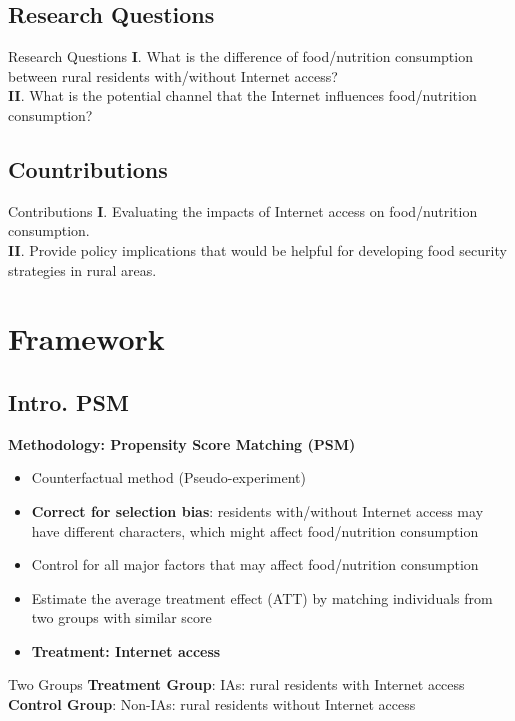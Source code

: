 \documentclass{beamer}	%
\theoremstyle{plain}
\theoremstyle{definition}
\theoremstyle{remark}
\numberwithin{equation}{section}
\begin{document}
\subsection {Research Questions}   
\begin{frame}
	\linespread{1.2}
	\begin{block}{Research Questions}
		\textbf{I}. What is the difference of food/nutrition consumption between rural residents with/without Internet access? \\
		\vspace{.1cm}
		\textbf{II}. What is the potential channel that the Internet influences food/nutrition consumption? \\
	\end{block}
\end{frame}

\subsection {Countributions}    
\begin{frame}
	\linespread{1.2}
	\begin{block}{Contributions}
		\textbf{I}. Evaluating the impacts of Internet access on food/nutrition consumption. \\
		\vspace{.1cm}
		\textbf{II}. Provide policy implications that would be helpful for developing food security strategies in rural areas. 
	\end{block}
\end{frame}


\section{Framework}

\subsection {Intro. PSM}
\begin{frame}
	\textbf{Methodology: Propensity Score Matching (PSM)} \\
	\begin{itemize}
		\item Counterfactual method (Pseudo-experiment)
		\item \textbf{Correct for selection bias}: residents with/without Internet access may have different characters, which might affect food/nutrition consumption
		\item Control for all major factors that may affect food/nutrition consumption
		\item Estimate the average treatment effect (ATT) by matching individuals from two groups with similar score
		\item \textbf{Treatment: Internet access}
	\end{itemize}
	\begin{block}{Two Groups}
		\textbf{Treatment Group}: IAs: rural residents with Internet access \\
		\textbf{Control Group}: Non-IAs: rural residents without Internet access
	\end{block}
\end{frame}
\end{document}
